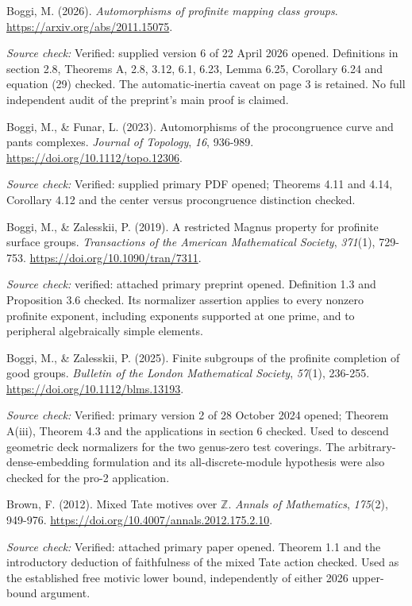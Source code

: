 \documentclass[10pt,a4paper]{article}
\begin{document}
Boggi, M. (2026). \emph{Automorphisms of profinite mapping class groups}. \url{https://arxiv.org/abs/2011.15075}.

\emph{Source check:} Verified: supplied version 6 of 22 April 2026 opened. Definitions in section 2.8, Theorems A, 2.8, 3.12, 6.1, 6.23, Lemma 6.25, Corollary 6.24 and equation (29) checked. The automatic-inertia caveat on page 3 is retained. No full independent audit of the preprint's main proof is claimed.

Boggi, M., \& Funar, L. (2023). Automorphisms of the procongruence curve and pants complexes. \emph{Journal of Topology}, \emph{16}, 936-989. \url{https://doi.org/10.1112/topo.12306}.

\emph{Source check:} Verified: supplied primary PDF opened; Theorems 4.11 and 4.14, Corollary 4.12 and the center versus procongruence distinction checked.

Boggi, M., \& Zalesskii, P. (2019). A restricted Magnus property for profinite surface groups. \emph{Transactions of the American Mathematical Society}, \emph{371}(1), 729-753. \url{https://doi.org/10.1090/tran/7311}.

\emph{Source check:} verified: attached primary preprint opened. Definition 1.3 and Proposition 3.6 checked. Its normalizer assertion applies to every nonzero profinite exponent, including exponents supported at one prime, and to peripheral algebraically simple elements.

Boggi, M., \& Zalesskii, P. (2025). Finite subgroups of the profinite completion of good groups. \emph{Bulletin of the London Mathematical Society}, \emph{57}(1), 236-255. \url{https://doi.org/10.1112/blms.13193}.

\emph{Source check:} Verified: primary version 2 of 28 October 2024 opened; Theorem A(iii), Theorem 4.3 and the applications in section 6 checked. Used to descend geometric deck normalizers for the two genus-zero test coverings. The arbitrary-dense-embedding formulation and its all-discrete-module hypothesis were also checked for the pro-2 application.

Brown, F. (2012). Mixed Tate motives over \(\mathbb Z\). \emph{Annals of Mathematics}, \emph{175}(2), 949-976. \url{https://doi.org/10.4007/annals.2012.175.2.10}.

\emph{Source check:} Verified: attached primary paper opened. Theorem 1.1 and the introductory deduction of faithfulness of the mixed Tate action checked. Used as the established free motivic lower bound, independently of either 2026 upper-bound argument.
\end{document}
